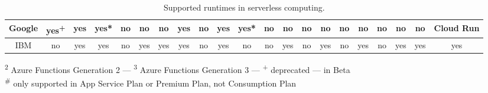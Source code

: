 \begin{table*}[!t]
{\begin{tabular}{|l|l|c|c|c|c|c|c|c|c|c|c|c|c|c|c|c|c|c|c|c|c|}
 \multicolumn{2}{|c|}{Google} & \cellcolor{green!25}yes\textsuperscript{+} & \cellcolor{green!25}yes & \cellcolor{green!25}yes* & \cellcolor{red!25}no & \cellcolor{red!25}no & \cellcolor{red!25}no & \cellcolor{green!25}yes & \cellcolor{red!25}no & \cellcolor{green!25}yes & \cellcolor{green!25}yes* & \cellcolor{red!25}no & \cellcolor{red!25}no & \cellcolor{red!25}no & \cellcolor{red!25}no & \cellcolor{red!25}no & \cellcolor{red!25}no & \cellcolor{red!25}no & \cellcolor{red!25}no & \cellcolor{red!25}no & \cellcolor{yellow!25}Cloud Run \\ \hline
 \multicolumn{2}{|c|}{IBM} & \cellcolor{red!25}no & \cellcolor{green!25}yes & \cellcolor{green!25}yes & \cellcolor{red!25}no & \cellcolor{green!25}yes & \cellcolor{green!25}yes & \cellcolor{green!25}yes & \cellcolor{red!25}no & \cellcolor{green!25}yes & \cellcolor{red!25}no & \cellcolor{red!25}no & \cellcolor{green!25}yes & \cellcolor{red!25}no & \cellcolor{green!25}yes & \cellcolor{red!25}no & \cellcolor{green!25}yes & \cellcolor{red!25}no & \cellcolor{green!25}yes & \cellcolor{green!25}yes & \cellcolor{green!25}yes \\ \hline
\end{tabular}}
\caption{Supported runtimes in serverless computing.}{\textsuperscript{2} Azure Functions Generation 2 \enspace --- \enspace \textsuperscript{3} Azure Functions Generation 3 \enspace --- \enspace \textsuperscript{+} deprecated \enspace --- \enspace * in Beta}\\{\textsuperscript{\#} only supported in App Service Plan or Premium Plan, not Consumption Plan}
\label{table:programming_languages}
\end{table*}